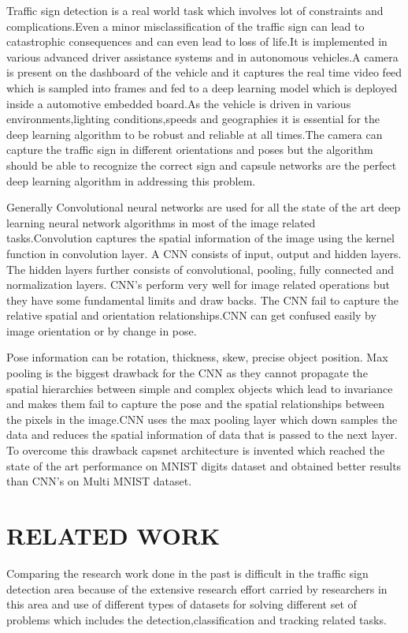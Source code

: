 \documentclass[letterpaper, 10 pt, conference]{ieeeconf}  %
\begin{document}
Traffic sign detection is a real world task which involves lot of constraints and complications.Even a minor misclassification of the traffic sign can lead to catastrophic consequences and can even lead to loss of life.It is implemented in various advanced driver assistance systems and in autonomous vehicles.A camera is present on the dashboard of the vehicle and it captures the real time video feed which is sampled into frames and fed to a deep learning model which is deployed inside a automotive embedded board.As the vehicle is driven in various environments,lighting conditions,speeds and geographies it is essential for the deep learning algorithm to be robust and reliable at all times.The camera can capture the traffic sign in different orientations and poses but the algorithm should be able to recognize the correct sign\cite{8126154} and capsule networks are the perfect deep learning algorithm in addressing this problem.\par
Generally Convolutional neural networks are used for all the state of the art deep learning neural network algorithms\cite{wu2013traffic} in most of the image related tasks.Convolution captures the spatial information of the image using the kernel function in convolution layer. A CNN consists of input, output and hidden layers. The hidden layers further consists of convolutional, pooling, fully connected and normalization layers.
CNN’s perform very well for image related operations but they have some fundamental limits and draw backs. The CNN fail\cite{2015arXiv150602025J} to capture the relative spatial and orientation relationships.CNN can get confused easily by image orientation or by change in pose.\par
Pose information can be rotation, thickness, skew, precise object position. Max pooling is the biggest drawback for the CNN as they cannot propagate the spatial hierarchies between simple and complex objects which lead to invariance and makes them fail to capture the pose and the spatial relationships between the pixels in the image.CNN uses the max pooling layer which down samples the data and reduces the spatial information of data that is passed to the next layer. To overcome this drawback capsnet architecture is invented which reached the state of the art performance on MNIST digits dataset\cite{hinton2018matrix} and obtained better results than CNN’s on Multi MNIST dataset.


\section{RELATED WORK}
Comparing the research work done in the past is difficult in the traffic sign detection area because of the extensive research effort carried by researchers in this area and use of different types of datasets for solving different set of problems which includes the detection,classification and tracking related tasks.
\end{document}
